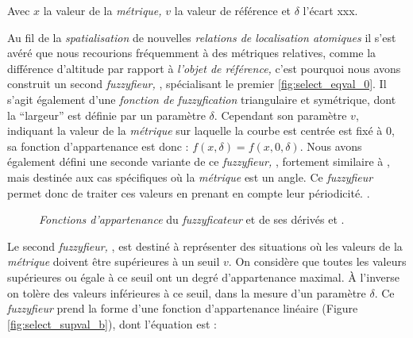 Avec \(x\) la valeur de la \emph{métrique,} \(v\) la valeur de
référence et \(\delta\) l'écart xxx.

Au fil de la \emph{spatialisation} de nouvelles \emph{relations de
  localisation atomiques} il s'est avéré que nous recourions
fréquemment à des métriques relatives, comme la différence d'altitude
par rapport à \emph{l'objet de référence,} c'est pourquoi nous avons
construit un second \emph{fuzzyfieur,} , spécialisant le
premier \autoref{fig:select_eqval_0}. Il s'agit également d'une
\emph{fonction de fuzzyfication} triangulaire et symétrique, dont la
\enquote{largeur} est définie par un paramètre \(\delta\). Cependant
son paramètre \(v\), indiquant la valeur de la \emph{métrique} sur
laquelle la courbe est centrée est fixé à 0, sa fonction
d'appartenance est donc : \(f(x,\delta) = f(x,0,\delta)\). Nous avons
également défini une seconde variante de ce \emph{fuzzyfieur,}
, fortement similaire à , mais destinée
aux cas spécifiques où la \emph{métrique} est un angle. Ce
\emph{fuzzyfieur} permet donc de traiter ces valeurs en prenant en
compte leur périodicité. .

\begin{figure}
  \centering
  
  \hfill  
  \caption{\emph{Fonctions d'appartenance} du \emph{fuzzyficateur}
    \protect{} et de ses dérivés \protect{}
    et \protect{}.}
  \label{fig:select_eqval}
\end{figure}

Le second \emph{fuzzyfieur,} , est destiné à
représenter des situations où les valeurs de la \emph{métrique}
doivent être supérieures à un seuil \(v\). On considère que toutes les
valeurs supérieures ou égale à ce seuil ont un degré d'appartenance
maximal. À l'inverse on tolère des valeurs inférieures à ce seuil,
dans la mesure d'un paramètre \(\delta\). Ce \emph{fuzzyfieur} prend
la forme d'une fonction d'appartenance linéaire (Figure
\ref{fig:select_supval_b}), dont l'équation est :

